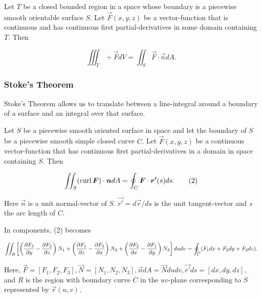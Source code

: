 \documentclass{article}
\begin{document}
\begin{theorem}\label{divergence-theorem}
Let $T$ be a closed \@{bounded} region in a space whose \@{boundary} is a \@{piecewise} \@{smooth} \@{orientable} surface $S.$ Let $\vec{F}(x,y,z)$ be a \@{vector-function} that is \@{continuous} and has \@{continuous} first \@{partial-derivatives} in some \@{domain} containing $T.$ Then

\[ \iiint_T \div{\vec{F}} dV = \iint_S \vec{F} \cdot \vec{n} dA. \]
\end{theorem}

\subsubsection{Stoke's Theorem}

Stoke's Theorem allows us to translate between a \@{line-integral} around a \@{boundary} of a surface and an integral over that surface.

\begin{theorem}
Let $S$ be a \@{piecewise} \@{smooth} oriented surface in space and let the \@{boundary} of $S$ be a piecewise smooth simple closed curve $C.$ Let $\vec{F}(x,y,z)$ be a \@{continuous} \@{vector-function} that has \@{continuous} first \@{partial-derivatives} in a \@{domain} in space containing $S.$ Then

\[ \iint_S (\operatorname{curl}{\boldsymbol{F}}) \cdot \boldsymbol{n} dA = \oint_C \boldsymbol{F} \cdot \boldsymbol{r'}(s) ds. \tag{2} \]

Here $\vec{n}$ is a \@{unit} \@{normal-vector} of $S.$ $\vec{r'} = d \vec{r}/ds$ is the \@{unit} \@{tangent-vector} and $s$ the arc length of $C.$

In \@{components}, (2) becomes

\[ \iint_R \left [ \left(\frac{\partial F_3}{\partial y} - \frac{\partial F_2}{\partial z}\right) N_1 +
\left(\frac{\partial F_1}{\partial z} - \frac{\partial F_3}{\partial x}\right) N_2 +
 \left(\frac{\partial F_2}{\partial x} - \frac{\partial F_1}{\partial y}\right) N_3
\right ] du dv \\
= \oint_{\overline{C}} (F_1 dx + F_2 dy + F_3 dz). \]

Here, $ \vec{F} = [F_1, F_2, F_3], \vec{N} = [N_1, N_2, N_3], \vec{n}dA = \vec{N} du dv, \vec{r'} ds = [dx, dy, dz],$ and $R$ is the region with boundary curve $\overline{C}$ in the $uv$-plane corresponding to $S$ represented by $\vec{r}(u,v).$
\end{theorem}
\end{document}
